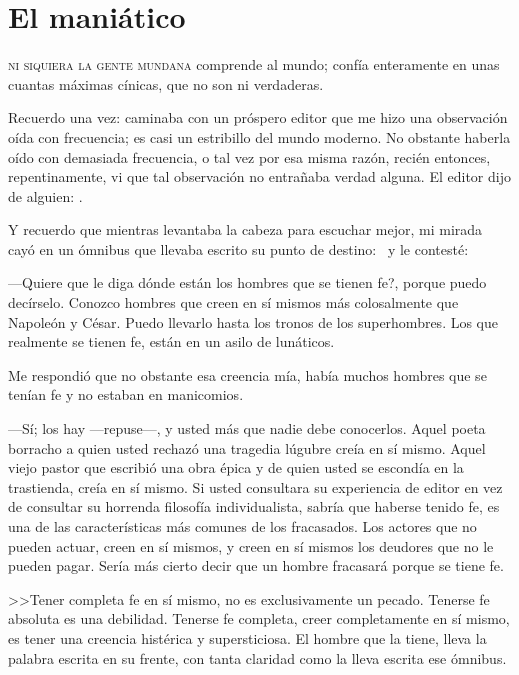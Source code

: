 \chapter{El maniático}%
\label{cha:El maniático}

\textsc{ni siquiera la gente mundana} comprende al mundo; confía enteramente en unas cuantas máximas
cínicas, que no son ni verdaderas.

Recuerdo una vez: caminaba con un próspero editor que me hizo una observación oída con
frecuencia; es casi un estribillo del mundo moderno. No obstante haberla oído con demasiada frecuencia,
o tal vez por esa misma razón, recién entonces, repentinamente, vi que tal observación no entrañaba
verdad alguna. El editor dijo de alguien: .

Y recuerdo que mientras levantaba la cabeza para escuchar mejor, mi mirada cayó en un ómnibus
que llevaba escrito su punto de destino: \, y le contesté: 

---Quiere que le diga dónde están los
hombres que se tienen fe?, porque puedo decírselo. Conozco hombres que creen en sí mismos más
colosalmente que Napoleón y César. Puedo llevarlo hasta los tronos de los superhombres. Los que
realmente se tienen fe, están en un asilo de lunáticos.

Me respondió que no obstante esa creencia mía, había muchos hombres que se tenían fe y no
estaban en manicomios.

	---Sí; los hay ---repuse---, y usted más que nadie debe conocerlos. Aquel poeta borracho a quien usted
rechazó una tragedia lúgubre creía en sí mismo. Aquel viejo pastor que escribió una obra épica y de quien
usted se escondía en la trastienda, creía en sí mismo. Si usted consultara su experiencia de editor en vez
de consultar su horrenda filosofía individualista, sabría que haberse tenido fe, es una de las características
más comunes de los fracasados. Los actores que no pueden actuar, creen en sí mismos, y creen en sí
mismos los deudores que no le pueden pagar. Sería más cierto decir que un hombre fracasará porque se
tiene fe.

	>>Tener completa fe en sí mismo, no es exclusivamente un pecado. Tenerse fe absoluta es una
debilidad. Tenerse fe completa, creer completamente en sí mismo, es tener una creencia histérica y
supersticiosa. El hombre que la tiene, lleva la palabra  escrita en su frente, con tanta claridad
como la lleva escrita ese ómnibus.

